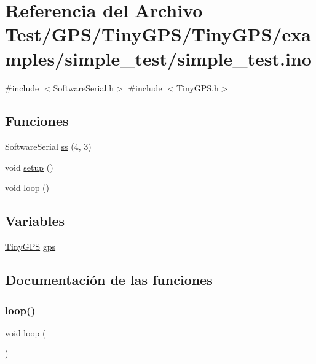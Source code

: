 \hypertarget{simple__test_8ino}{}\section{Referencia del Archivo Test/\+G\+P\+S/\+Tiny\+G\+P\+S/\+Tiny\+G\+P\+S/examples/simple\+\_\+test/simple\+\_\+test.ino}
\label{simple__test_8ino}
{\ttfamily \#include $<$Software\+Serial.\+h$>$}\newline
{\ttfamily \#include $<$Tiny\+G\+P\+S.\+h$>$}\newline
\subsection*{Funciones}
\begin{DoxyCompactItemize}
\item 
Software\+Serial \hyperlink{simple__test_8ino_ad6146be3f2c4ff5ac64c90ef5d1b37b1}{ss} (4, 3)
\item 
void \hyperlink{simple__test_8ino_a4fc01d736fe50cf5b977f755b675f11d}{setup} ()
\item 
void \hyperlink{simple__test_8ino_afe461d27b9c48d5921c00d521181f12f}{loop} ()
\end{DoxyCompactItemize}
\subsection*{Variables}
\begin{DoxyCompactItemize}
\item 
\hyperlink{class_tiny_g_p_s}{Tiny\+G\+PS} \hyperlink{simple__test_8ino_a4e2f9a5d1b23f30f530101af71f72744}{gps}
\end{DoxyCompactItemize}


\subsection{Documentación de las funciones}
\mbox{\label{simple__test_8ino_afe461d27b9c48d5921c00d521181f12f}} 
\subsubsection{\texorpdfstring{loop()}{loop()}}
{\footnotesize\ttfamily void loop (\begin{DoxyParamCaption}{ }\end{DoxyParamCaption})}



